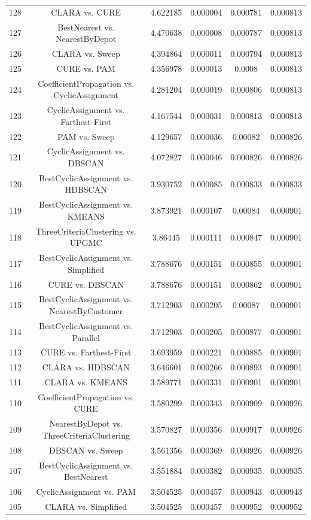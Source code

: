 \documentclass[a4paper,10pt]{article}
\begin{document}
\begin{landscape}
\begin{table}[!htp]
\begin{tabular}{cccccc}
128&CLARA vs. CURE&4.622185&0.000004&0.000781&0.000813\\
127&BestNearest vs. NearestByDepot&4.470638&0.000008&0.000787&0.000813\\
126&CLARA vs. Sweep&4.394864&0.000011&0.000794&0.000813\\
125&CURE vs. PAM&4.356978&0.000013&0.0008&0.000813\\
124&CoefficientPropagation vs. CyclicAssignment&4.281204&0.000019&0.000806&0.000813\\
123&CyclicAssignment vs. Farthest-First&4.167544&0.000031&0.000813&0.000813\\
122&PAM vs. Sweep&4.129657&0.000036&0.00082&0.000826\\
121&CyclicAssignment vs. DBSCAN&4.072827&0.000046&0.000826&0.000826\\
120&BestCyclicAssignment vs. HDBSCAN&3.930752&0.000085&0.000833&0.000833\\
119&BestCyclicAssignment vs. KMEANS&3.873921&0.000107&0.00084&0.000901\\
118&ThreeCriteriaClustering vs. UPGMC&3.86445&0.000111&0.000847&0.000901\\
117&BestCyclicAssignment vs. Simplified&3.788676&0.000151&0.000855&0.000901\\
116&CURE vs. DBSCAN&3.788676&0.000151&0.000862&0.000901\\
115&BestCyclicAssignment vs. NearestByCustomer&3.712903&0.000205&0.00087&0.000901\\
114&BestCyclicAssignment vs. Parallel&3.712903&0.000205&0.000877&0.000901\\
113&CURE vs. Farthest-First&3.693959&0.000221&0.000885&0.000901\\
112&CLARA vs. HDBSCAN&3.646601&0.000266&0.000893&0.000901\\
111&CLARA vs. KMEANS&3.589771&0.000331&0.000901&0.000901\\
110&CoefficientPropagation vs. CURE&3.580299&0.000343&0.000909&0.000926\\
109&NearestByDepot vs. ThreeCriteriaClustering&3.570827&0.000356&0.000917&0.000926\\
108&DBSCAN vs. Sweep&3.561356&0.000369&0.000926&0.000926\\
107&BestCyclicAssignment vs. BestNearest&3.551884&0.000382&0.000935&0.000935\\
106&CyclicAssignment vs. PAM&3.504525&0.000457&0.000943&0.000943\\
105&CLARA vs. Simplified&3.504525&0.000457&0.000952&0.000952\\

\end{tabular}
\end{table}
\end{landscape}
\end{document}
